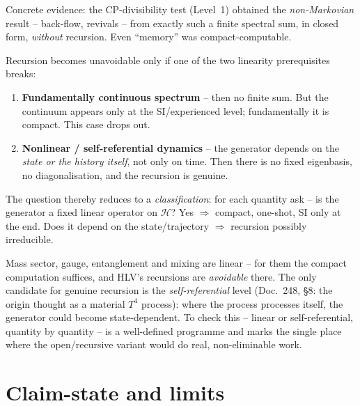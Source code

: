 Concrete evidence: the CP-divisibility test (Level~1) obtained the
\emph{non-Markovian} result -- back-flow, revivals -- from exactly such a finite
spectral sum, in closed form, \emph{without} recursion. Even \enquote{memory}
was compact-computable.

\begin{important}
Recursion becomes unavoidable only if one of the two linearity prerequisites
breaks:
\begin{enumerate}
  \item \textbf{Fundamentally continuous spectrum} -- then no finite sum. But
        the continuum appears only at the SI/experienced level; fundamentally
        it is compact. This case drops out.
  \item \textbf{Nonlinear / self-referential dynamics} -- the generator depends
        on the \emph{state or the history itself}, not only on time. Then there
        is no fixed eigenbasis, no diagonalisation, and the recursion is
        genuine.
\end{enumerate}
\end{important}

The question thereby reduces to a \emph{classification}: for each quantity ask
-- is the generator a fixed linear operator on $\mathcal{H}$? Yes $\Rightarrow$
compact, one-shot, SI only at the end. Does it depend on the state/trajectory
$\Rightarrow$ recursion possibly irreducible.

Mass sector, gauge, entanglement and mixing are linear -- for them the compact
computation suffices, and HLV's recursions are \emph{avoidable} there. The only
candidate for genuine recursion is the \emph{self-referential} level (Doc.~248,
§8: the origin thought as a material $T^4$ process): where the process
processes itself, the generator could become state-dependent. To check this --
linear or self-referential, quantity by quantity -- is a well-defined programme
and marks the single place where the open/recursive variant would do real,
non-eliminable work.

\section{Claim-state and limits}

